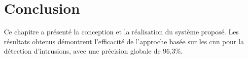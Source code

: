 \section*{Conclusion}

Ce chapitre a présenté la conception et la réalisation du système proposé. Les résultats obtenus démontrent l'efficacité de l'approche basée sur les \gls{cnn} pour la détection d'intrusions, avec une précision globale de 96,3\%.
